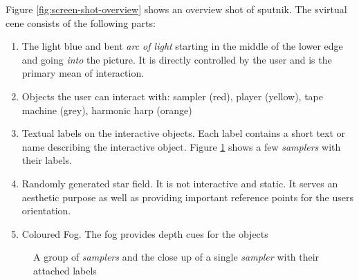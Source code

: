 \documentclass[10pt,a4paper]{scrartcl}
\begin{document}
Figure \ref{fig:screen-shot-overview} shows an overview shot of sputnik. The svirtual cene consists of the following parts:
\begin{enumerate}
\item The light blue and bent \emph{arc of light} starting in the middle of the lower edge and going \emph{into} the picture. It is directly controlled by the user and is the primary mean of interaction.

\item Objects the user can interact with: sampler (red), player (yellow), tape machine (grey), harmonic harp (orange)

\item Textual labels on the interactive objects. Each label contains a short text or name describing the interactive object. Figure \ref{fig:sampler-labels} shows a few \emph{samplers} with their labels.

\item Randomly generated star field. It is not interactive and static. It serves an aesthetic purpose as well as providing important reference points for the users orientation.

\item Coloured Fog. The fog provides depth cues for the objects
\end{enumerate}

\begin{figure}[hbtp]
\begin{center}
\caption{A group of \emph{samplers} and the close up of a single \emph{sampler} with their attached labels}
\label{fig:sampler-labels}
\end{center}
\end{figure}
\end{document}

